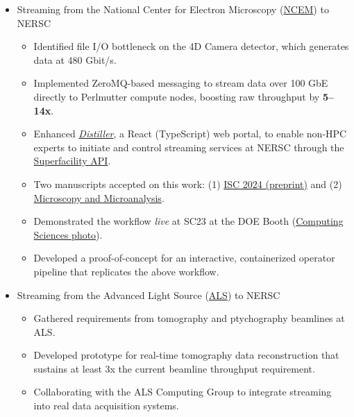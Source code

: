 \documentclass[11pt]{article} %
\begin{document}
\begin{itemize}
  \item Streaming from the National Center for Electron Microscopy (\href{https://foundry.lbl.gov/about/facilities/the-national-center-for-electron-microscopy-ncem/}{NCEM}) to NERSC
    \begin{itemize}
      \item Identified file I/O bottleneck on the 4D Camera detector, which generates data at 480 Gbit/s.
      \item Implemented ZeroMQ-based messaging to stream data over 100 GbE directly to Perlmutter compute nodes, boosting raw throughput by \textbf{5--14x}.
      \item Enhanced \textit{\href{https://github.com/OpenChemistry/distiller}{Distiller}}, a React (TypeScript) web portal, to enable non-HPC experts to initiate and control streaming services at NERSC through the \href{https://docs.nersc.gov/services/sfapi/}{Superfacility API}.\
      \item Two manuscripts accepted on this work: (1) \href{https://arxiv.org/abs/2403.14352}{ISC 2024 (preprint)} and (2) \href{https://doi.org/10.1093/mam/ozae109}{Microscopy and Microanalysis}.
      \item Demonstrated the workflow \textit{live} at SC23 at the DOE Booth (\href{https://media.licdn.com/dms/image/v2/D5622AQGfyrY4f3aUZA/feedshare-shrink_2048_1536/feedshare-shrink_2048_1536/0/1700156147009?e=1733356800&v=beta&t=e2Myg_yb3r7hLHQsPGJYdi67cq30veIGsyed4i8dZ5s}{Computing Sciences photo}).
      \item Developed a proof-of-concept for an interactive, containerized operator pipeline that replicates the above workflow.
    \end{itemize}

  \item Streaming from the Advanced Light Source (\href{https://als.lbl.gov/}{ALS}) to NERSC
    \begin{itemize}
      \item Gathered requirements from tomography and ptychography beamlines at ALS.\
      \item Developed prototype for real-time tomography data reconstruction that sustains at least 3x the current beamline throughput requirement.
      \item Collaborating with the ALS Computing Group to integrate streaming into real data acquisition systems.
    \end{itemize}
    \newpage


\end{itemize}
\end{document}
